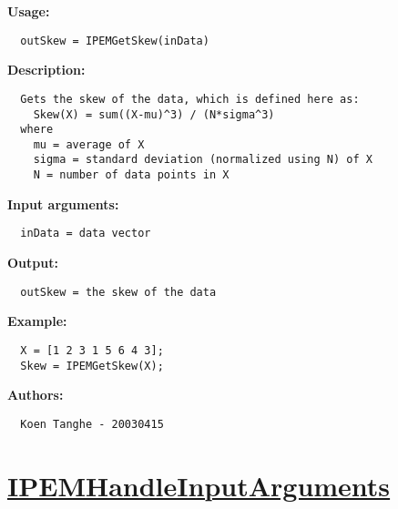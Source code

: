 \textbf{Usage:}
\begin{verbatim}  outSkew = IPEMGetSkew(inData)

\end{verbatim}
\textbf{Description:}
\begin{verbatim}  Gets the skew of the data, which is defined here as:
    Skew(X) = sum((X-mu)^3) / (N*sigma^3)
  where
    mu = average of X
    sigma = standard deviation (normalized using N) of X
    N = number of data points in X

\end{verbatim}
\textbf{Input arguments:}
\begin{verbatim}  inData = data vector

\end{verbatim}
\textbf{Output:}
\begin{verbatim}  outSkew = the skew of the data

\end{verbatim}
\textbf{Example:}
\begin{verbatim}  X = [1 2 3 1 5 6 4 3];
  Skew = IPEMGetSkew(X);

\end{verbatim}
\textbf{Authors:}
\begin{verbatim}  Koen Tanghe - 20030415
\end{verbatim}


\newpage
\section*{\hyperlink{Concepts:IPEMHandleInputArguments}{IPEMHandleInputArguments}}
\hypertarget{FuncRef:IPEMHandleInputArguments}{}


